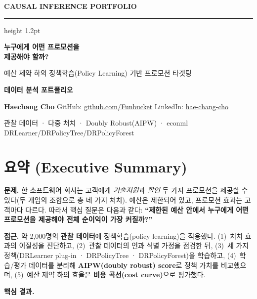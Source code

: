 \documentclass[11pt]{article}
\begin{document}
\thispagestyle{empty}
\vspace*{1.2cm}
{\sffamily\bfseries\color{brand}\large CAUSAL INFERENCE PORTFOLIO}
\vskip 2pt
{\color{rulegray}\hrule height 1.2pt}

\vspace{4.5cm}
{\sffamily\bfseries\fontsize{30}{36}\selectfont 누구에게 어떤 프로모션을\\[4pt] 제공해야 할까?\par}
\vspace{0.8cm}
{\sffamily\Large\color{ink} 예산 제약 하의 정책학습(Policy Learning) 기반 프로모션 타겟팅\par}

\vspace{3.2cm}
{\sffamily\large\bfseries\color{brand} 데이터 분석 포트폴리오\par}

\vfill
{\footnotesize\color{ink}
\textbf{Haechang Cho} \quad
GitHub: \href{https://github.com/Funbucket}{github.com/Funbucket} \quad
LinkedIn: \href{https://www.linkedin.com/in/hae-chang-cho/}{hae-chang-cho}\par
\vskip 4pt
관찰 데이터 · 다중 처치 · Doubly Robust(AIPW) · econml DRLearner/DRPolicyTree/DRPolicyForest
}
\newpage

\section*{\sffamily\color{brand} 요약 (Executive Summary)}

\textbf{문제.} 한 소프트웨어 회사는 고객에게 \emph{기술지원}과 \emph{할인} 두 가지 프로모션을 제공할 수 있다(두 개입의 조합으로 총 네 가지 처치). 예산은 제한되어 있고, 프로모션 효과는 고객마다 다르다. 따라서 핵심 질문은 다음과 같다: \textbf{``제한된 예산 안에서 누구에게 어떤 프로모션을 제공해야 전체 순이익이 가장 커질까?''}

\textbf{접근.} 약 2{,}000명의 \textbf{관찰 데이터}에 정책학습(policy learning)을 적용했다. (1)~처치 효과의 이질성을 진단하고, (2)~관찰 데이터의 인과 식별 가정을 점검한 뒤, (3)~세 가지 정책(DRLearner plug-in · DRPolicyTree · DRPolicyForest)을 학습하고, (4)~학습/평가 데이터를 분리해 \textbf{AIPW(doubly robust) score}로 정책 가치를 비교했으며, (5)~예산 제약 하의 효율은 \textbf{비용 곡선(cost curve)}으로 평가했다.

\textbf{핵심 결과.}
\end{document}
